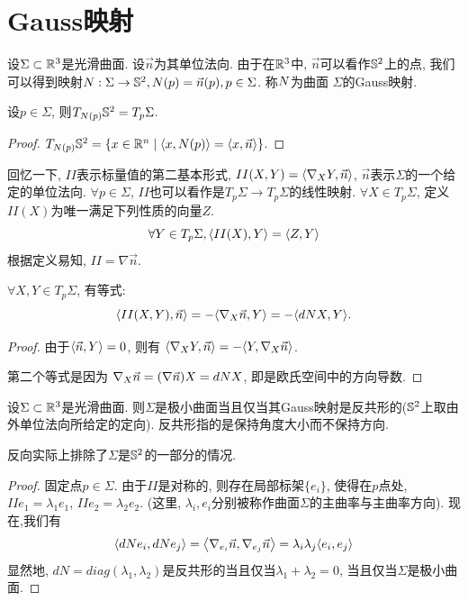 \section{Gauss映射}
设$\Sigma \subset \R^3$是光滑曲面. 设$\vec{n}$为其单位法向. 由于在$\R^3$中, $\vec{n}$可以看作$\S^2$上的点, 我们可以得到映射$\N:\Sigma \to  \S^2, \N(p)=\vec{n}(p), p \in \Sigma$. 称$\N$为曲面 $\Sigma$的Gauss映射.
\begin{proposition}
    设$p \in \Sigma$, 则$T_{\N(p)}\S^2= T_p\Sigma$.
\end{proposition}
\begin{proof}
    $T_{\N(p)}\S^2=\{x\in \R^n\mid \inner{x}{\N(p)}=\inner{x}{\vec{n}}\}$.
\end{proof}
回忆一下, $II$表示标量值的第二基本形式, $II(X,Y)=\inner{\nabla_XY}{\vec{n}}$, $\vec{n}$表示$\Sigma$的一个给定的单位法向. $\forall p \in \Sigma$, $II$也可以看作是$T_p\Sigma \to T_p \Sigma$的线性映射.  $\forall X \in T_p\Sigma$, 定义$II(X)$为唯一满足下列性质的向量$Z$.
\begin{equation}
    \forall Y \in T_p\Sigma, \inner{II(X)}{Y}=\inner{Z}{Y}
\end{equation}
根据定义易知, $II= \nabla \vec{n}$.
\begin{proposition}
    $\forall X, Y \in T_p\Sigma$, 有等式: 
    \begin{equation}
        \inner{II(X,Y)}{\vec{n}}=-\inner{\nabla_X\vec{n}}{Y}=-\inner{d\N X}{Y}.
    \end{equation}
\end{proposition}
\begin{proof}
    由于$\inner{\vec{n}}{Y}=0$, 则有 $\inner{\nabla_XY}{\vec{n}}=-\inner{Y}{\nabla_X\vec{n}}$. 
    \par 第二个等式是因为 $\nabla_X\vec{n}=(\nabla \vec{n})X=d\N X$, 即是欧氏空间中的方向导数.
\end{proof}
\begin{proposition} \label{gauss_anticonformal}
    设$\Sigma \subset \R^3$是光滑曲面. 则$\Sigma$是极小曲面当且仅当其Gauss映射是反共形的($\S^2$上取由外单位法向所给定的定向). 反共形指的是保持角度大小而不保持方向.
\end{proposition}
\begin{remark}
    反向实际上排除了$\Sigma$是$\S^2$的一部分的情况.  
\end{remark}
\begin{proof}
    固定点$p \in \Sigma$. 由于$II$是对称的, 则存在局部标架$\{e_i\}$, 使得在$p$点处, $II e_1=\lambda_1 e_1$, $II e_2=\lambda_2 e_2$. (这里, $\lambda_i,e_i$分别被称作曲面$\Sigma$的主曲率与主曲率方向). 现在,我们有
    \begin{equation}
        \inner{d\N e_i}{d\N e_j}= \inner{\nabla_{e_i}\vec{n}}{\nabla_{e_j}\vec{n}} =\lambda_i\lambda_j\inner{e_i}{e_j}
    \end{equation}
    显然地,  $dN=diag(\lambda_1,\lambda_2)$是反共形的当且仅当$\lambda_1+\lambda_2=0$, 当且仅当$\Sigma$是极小曲面.
\end{proof}
